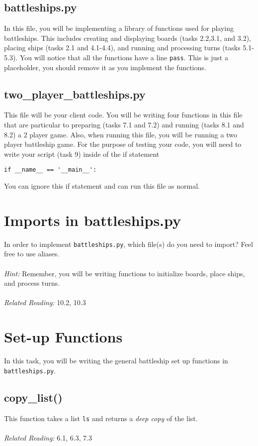 \documentclass{article}
\begin{document}
\subsection*{battleships.py}
In this file, you will be implementing a library of functions used for playing battleships. This includes creating and displaying boards (tasks 2.2,3.1, and 3.2), placing ships (tasks 2.1 and 4.1-4.4), and running and processing turns (tasks 5.1-5.3). You will notice that all the functions have a line \texttt{pass}. This is just a placeholder, you should remove it as you implement the functions.

\subsection*{two\_player\_battleships.py}
This file will be your client code. You will be writing four functions in this file that are particular to preparing (tasks 7.1 and 7.2) and running (tasks 8.1 and 8.2) a 2 player game. Also, when running this file, you will be running a two player battleship game. For the purpose of testing your code, you will need to write your script (task 9) inside of the if statement 
\begin{verbatim}
if __name__ == '__main__':
\end{verbatim}
You can ignore this if statement and can run this file as normal.

\section{Imports in battleships.py}
In order to implement \texttt{battleships.py}, which file(s) do you need to import? Feel free to use aliases. \\\\
\textit{Hint:} Remember, you will be writing functions to initialize boards, place ships, and process turns.\\\\
\textit{Related Reading:} 10.2, 10.3

\section{Set-up Functions}
In this task, you will be writing the general battleship set up functions in \texttt{battleships.py}.

\subsection{copy\_list()}
This function takes a list \texttt{ls} and returns a \textit{deep copy} of the list.\\\\
\textit{Related Reading:} 6.1, 6.3, 7.3  
\end{document}
